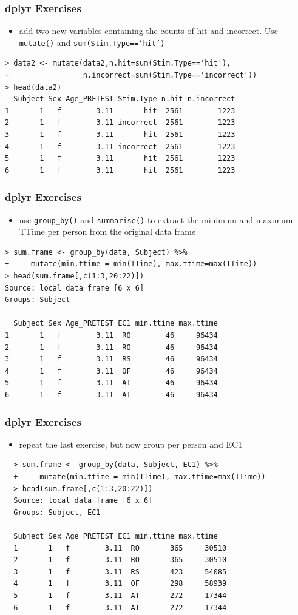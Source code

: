 \documentclass[xcolor={table},c]{beamer}
\begin{document}
\begin{frame}[fragile]\frametitle{dplyr Exercises}
  \begin{itemize}
  \item add two new variables containing the counts of hit and incorrect. Use \texttt{mutate()} and \texttt{sum(Stim.Type=='hit')}
  \end{itemize}\small
\begin{verbatim}
> data2 <- mutate(data2,n.hit=sum(Stim.Type=='hit'),
+                 n.incorrect=sum(Stim.Type=='incorrect'))
> head(data2)
  Subject Sex Age_PRETEST Stim.Type n.hit n.incorrect
1       1   f        3.11       hit  2561        1223
2       1   f        3.11 incorrect  2561        1223
3       1   f        3.11       hit  2561        1223
4       1   f        3.11 incorrect  2561        1223
5       1   f        3.11       hit  2561        1223
6       1   f        3.11       hit  2561        1223
\end{verbatim}
\end{frame}


\begin{frame}[fragile]\frametitle{dplyr Exercises}
  \begin{itemize}
  \item use \texttt{group\_by()} and \texttt{summarise()} to extract the minimum and maximum TTime per person from the original data frame
  \end{itemize}\small
\begin{verbatim}
> sum.frame <- group_by(data, Subject) %>% 
+     mutate(min.ttime = min(TTime), max.ttime=max(TTime))
> head(sum.frame[,c(1:3,20:22)])
Source: local data frame [6 x 6]
Groups: Subject

  Subject Sex Age_PRETEST EC1 min.ttime max.ttime
1       1   f        3.11  RO        46     96434
2       1   f        3.11  RO        46     96434
3       1   f        3.11  RS        46     96434
4       1   f        3.11  OF        46     96434
5       1   f        3.11  AT        46     96434
6       1   f        3.11  AT        46     96434
\end{verbatim}
\end{frame}


\begin{frame}[fragile]\frametitle{dplyr Exercises}
  \begin{itemize}
  \item repeat the last exercise, but now group per person and EC1
  \end{itemize}\small
\begin{verbatim}
  > sum.frame <- group_by(data, Subject, EC1) %>% 
  +     mutate(min.ttime = min(TTime), max.ttime=max(TTime))
  > head(sum.frame[,c(1:3,20:22)])
  Source: local data frame [6 x 6]
  Groups: Subject, EC1

  Subject Sex Age_PRETEST EC1 min.ttime max.ttime
  1       1   f        3.11  RO       365     30510
  2       1   f        3.11  RO       365     30510
  3       1   f        3.11  RS       423     54085
  4       1   f        3.11  OF       298     58939
  5       1   f        3.11  AT       272     17344
  6       1   f        3.11  AT       272     17344
\end{verbatim}
\end{frame}
\end{document}
